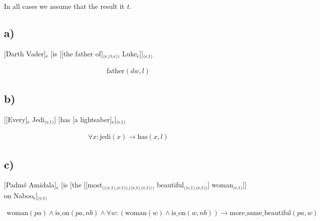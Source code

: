 \documentclass{article}
\renewcommand\t[1]{\text{#1}}
\newcommand\lwt[1]{$_\text{#1}$}
\begin{document}

\section{}

In all cases we assume that the result it \textit{t}.

\subsection*{a)}

[Darth Vader]\lwt{e}
[is [[the father of]\lwt{(e,(t,e))} Luke\lwt{e}]]\lwt{(e,t)}

\begin{gather*}
\t{father}(dw, l)
\end{gather*}

\subsection*{b)}

[[Every]\lwt{e} Jedi\lwt{(e,t)}]
[has [a lightsaber]\lwt{e}]\lwt{(e,t)}


\begin{gather*}
\forall x: \t{jedi}(x) \rightarrow \t{has}(x,l)
\end{gather*}

\subsection*{c)}

[Padmé Amidala]\lwt{e}
[is
[the [[most\lwt{(((e,t),(e,t)),((e,t),(e,t)))} beautiful\lwt{((e,t),(e,t))}] woman\lwt{(e,t)}]]
on Naboo\lwt{e}]\lwt{(e,t)}


\begin{gather*}
\t{woman}(pa) \wedge \t{is\_on}(pa,nb) \wedge \forall w: (\t{woman}(w)\wedge \t{is\_on}(w,nb)) \rightarrow  \t{more\_same\_beautiful}(pa,w)
\end{gather*}


\section{}

\subsection{}
\end{document}
